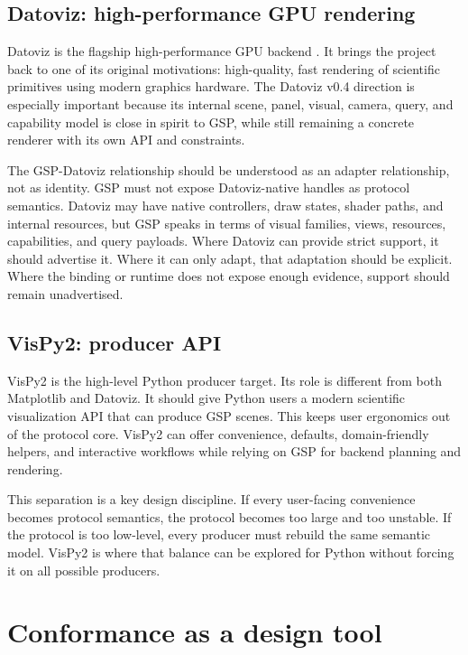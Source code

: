 \documentclass[a4paper,11pt]{article}
\newcommand{\gsp}{GSP\xspace}
\newcommand{\vispytwo}{VisPy2\xspace}
\newcommand{\datoviz}{Datoviz\xspace}
\newcommand{\matplotlib}{Matplotlib\xspace}
\begin{document}
\subsection{\datoviz: high-performance GPU rendering}

\datoviz is the flagship high-performance GPU backend \cite{Rossant:Datoviz}. It brings the project back to one of its
original motivations: high-quality, fast rendering of scientific primitives using modern graphics
hardware. The \datoviz v0.4 direction is especially important because its internal scene, panel,
visual, camera, query, and capability model is close in spirit to \gsp, while still remaining a
concrete renderer with its own API and constraints.

The \gsp-\datoviz relationship should be understood as an adapter relationship, not as identity.
\gsp must not expose \datoviz-native handles as protocol semantics. \datoviz may have native
controllers, draw states, shader paths, and internal resources, but \gsp speaks in terms of visual
families, views, resources, capabilities, and query payloads. Where \datoviz can provide strict
support, it should advertise it. Where it can only adapt, that adaptation should be explicit. Where
the binding or runtime does not expose enough evidence, support should remain unadvertised.

\subsection{\vispytwo: producer API}

\vispytwo is the high-level Python producer target. Its role is different from both \matplotlib and
\datoviz. It should give Python users a modern scientific visualization API that can produce \gsp
scenes. This keeps user ergonomics out of the protocol core. \vispytwo can offer convenience,
defaults, domain-friendly helpers, and interactive workflows while relying on \gsp for backend
planning and rendering.

This separation is a key design discipline. If every user-facing convenience becomes protocol
semantics, the protocol becomes too large and too unstable. If the protocol is too low-level, every
producer must rebuild the same semantic model. \vispytwo is where that balance can be explored for
Python without forcing it on all possible producers.

\section{Conformance as a design tool}
\end{document}
